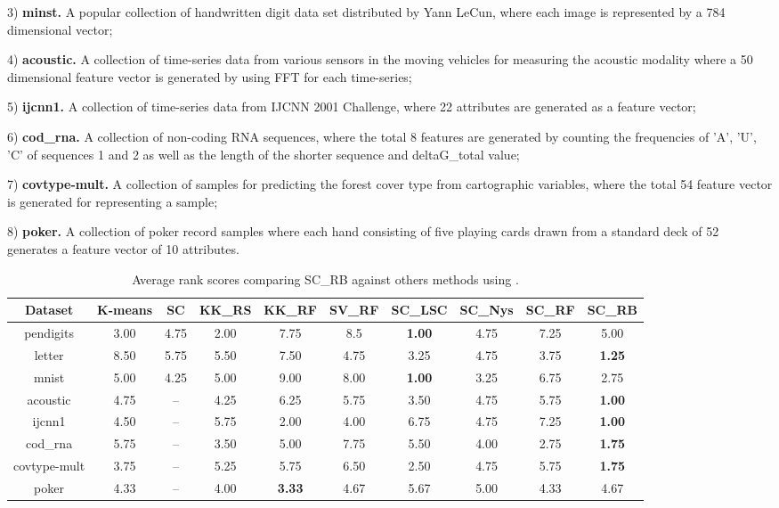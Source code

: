 \documentclass[sigconf]{acmart}
\newcommand{\1}{\boldsymbol{1}}
\newcommand{\0}{\boldsymbol{0}}
\begin{document}
3) \textbf{minst.} A popular collection of handwritten digit data set distributed by Yann LeCun, where each image is represented by a 784 dimensional vector; 

4) \textbf{acoustic.} A collection of time-series data from various sensors in the moving vehicles for measuring the acoustic modality where a 50 dimensional feature vector is generated by using FFT for each time-series; 

5) \textbf{ijcnn1.} A collection of time-series data from IJCNN 2001 Challenge, where 22 attributes are generated as a feature vector; 

6) \textbf{cod\_rna.} A collection of non-coding RNA sequences, where the total 8 features are generated by counting the frequencies of 'A', 'U', 'C' of sequences 1 and 2 as well as the length of the shorter sequence and deltaG\_total value;

7) \textbf{covtype-mult.} A collection of samples for predicting the forest cover type from cartographic variables, where the total 54 feature vector is generated for representing a sample;

8) \textbf{poker.} A collection of poker record samples where each hand consisting of five playing cards drawn from a standard deck of 52 generates a feature vector of 10 attributes.

\begin{table*}[t]
\centering
\caption{Average rank scores comparing SC\_RB against others methods using .}
\vspace{0mm}
\label{tb:ave_rank_alldata}
\newcommand{\Bd}[1]{\textbf{#1}}
\begin{center}
    \begin{tabular}{ c c c c c c c c c c}
    \hline
    Dataset & K-means & SC & KK\_RS & KK\_RF & SV\_RF & SC\_LSC & SC\_Nys & SC\_RF & SC\_RB \\ \hline 
    pendigits  & 3.00 & 4.75 & 2.00 & 7.75 & 8.5 & \Bd{1.00} & 4.75 & 7.25 & 5.00 \\ 
    letter	 & 8.50 & 5.75 & 5.50 & 7.50 & 4.75 & 3.25 & 4.75 & 3.75 & \Bd{1.25} \\ 
    mnist	& 5.00 & 4.25 & 5.00 & 9.00 & 8.00 & \Bd{1.00} & 3.25 & 6.75 & 2.75 \\ 
    acoustic  & 4.75 & -- & 4.25 & 6.25 & 5.75 & 3.50  & 4.75 & 5.75 & \Bd{1.00} \\ 
    ijcnn1  & 4.50 & -- & 5.75 & 2.00 & 4.00 & 6.75  & 4.75 & 7.25 & \Bd{1.00} \\ 
    cod\_rna  & 5.75 & -- & 3.50 & 5.00 & 7.75 & 5.50 & 4.00 & 2.75 & \Bd{1.75} \\ covtype-mult  & 3.75 & -- & 5.25 & 5.75 & 6.50 & 2.50 & 4.75 & 5.75 & \Bd{1.75} \\ poker  & 4.33 & -- & 4.00 & \Bd{3.33} & 4.67 & 5.67 & 5.00 & 4.33 & 4.67  \\ \hline
    \end{tabular}
\end{center}
\end{table*}
\end{document}
